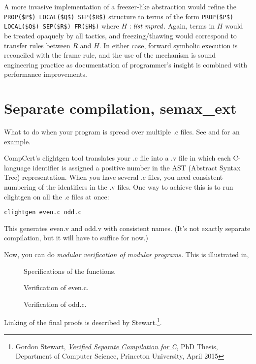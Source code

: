 \documentclass[12pt,fleqn,openany,oneside,showtrims]{memoir}
\begin{document}
A more invasive implementation of a freezer-like abstraction would
refine the \lstinline{PROP($P$) LOCAL($Q$) SEP($R$)} structure to
terms of the form \lstinline{PROP($P$) LOCAL($Q$) SEP($R$) FR($H$)}
where $H: \emph{list\ mpred}$. Again, terms in $H$ would be treated
opaquely by all tactics, and freezing/thawing would correspond to
transfer rules between $R$ and $H$. In either case, forward symbolic
execution is reconciled with the frame rule, and the use of the
mechanism is sound engineering practice as documentation of
programmer's insight is combined with performance improvements.

\chapter{Separate compilation, \upshape\textsf{semax\_ext}}
\label{refcard:sepcomp}

What to do when your program is spread over multiple .c files.
See  and  for an example.


CompCert's clightgen tool translates your .c file into a .v file
in which each C-language identifier is assigned a positive number
in the AST (Abstract Syntax Tree) representation.  When you have
several .c files, you need consistent numbering of the identifiers
in the .v files.  One way to achieve this is to run clightgen
on all the .c files at once:

\noindent\texttt{clightgen even.c odd.c}

This generates even.v and odd.v with consistent names.  (It's not
exactly separate compilation, but it will have to suffice for now.)

Now, you can do \emph{modular verification of modular programs.}  This is
illustrated in,

\begin{description}
\item[]  Specifications of the functions.
\item[] Verification of even.c.
\item[] Verification of odd.c.
\end{description}
Linking of the final proofs is described by Stewart.\footnote{Gordon Stewart,
  \emph{\href{http://www.cs.princeton.edu/research/techreps/TR-980-15}{Verified Separate Compilation for C}}, PhD Thesis, Department of Computer Science, Princeton University, April 2015}.
\end{document}
